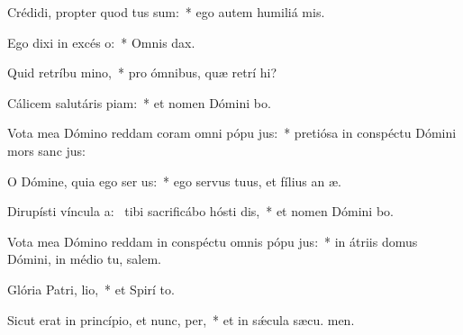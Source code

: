 \item Crédidi, propter quod tus sum:~* ego autem humiliá  mis.
\item Ego dixi in excés o:~* Omnis  dax.
\item Quid retríbu mino,~* pro ómnibus, quæ retrí hi?
\item Cálicem salutáris piam:~* et nomen Dómini bo.
\item Vota mea Dómino reddam coram omni pópu jus:~* pretiósa in conspéctu Dómini mors sanc jus:
\item O Dómine, quia ego ser us:~* ego servus tuus, et fílius an æ.
\item Dirupísti víncula a:~\pscross{} tibi sacrificábo hósti dis,~* et nomen Dómini bo.
\item Vota mea Dómino reddam in conspéctu omnis pópu jus:~* in átriis domus Dómini, in médio tu, salem.
\item Glória Patri,  lio,~* et Spirí to.
\item Sicut erat in princípio, et nunc,  per,~* et in sǽcula sæcu. men.
